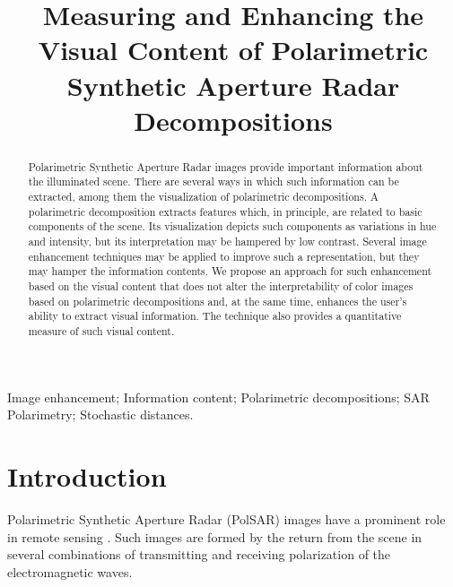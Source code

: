 \documentclass{article}
\title{Measuring and Enhancing the Visual Content of Polarimetric Synthetic Aperture Radar Decompositions}
\begin{document}
%
\maketitle
%
\begin{abstract}
Polarimetric Synthetic Aperture Radar images provide important information about the illuminated scene.
There are several ways in which such information can be extracted, among them the visualization of polarimetric decompositions.
A polarimetric decomposition extracts features which, in principle, are related to basic components of the scene.
Its visualization depicts such components as variations in hue and intensity, but its interpretation may be hampered by low contrast.
Several image enhancement techniques may be applied to improve such a representation, but they may hamper the information contents.
We propose an approach for such enhancement based on the visual content that does not alter the interpretability of color images based on polarimetric decompositions and, at the same time, enhances the user's ability to extract visual information.
The technique also provides a quantitative measure of such visual content.
\end{abstract}
%
\begin{keywords}
Image enhancement;
Information content;
Polarimetric decompositions;
SAR Polarimetry;
Stochastic distances.
\end{keywords}
%
\section{Introduction}
\label{sec:intro}

Polarimetric Synthetic Aperture Radar (PolSAR) images have a prominent role in remote sensing \citep{PolarisationApplicationsRemoteSensing,LeePottier2009PolarimetricRadarImaging}.
Such images are formed by the return from the scene in several combinations of transmitting and receiving polarization of the electromagnetic waves.
\end{document}

